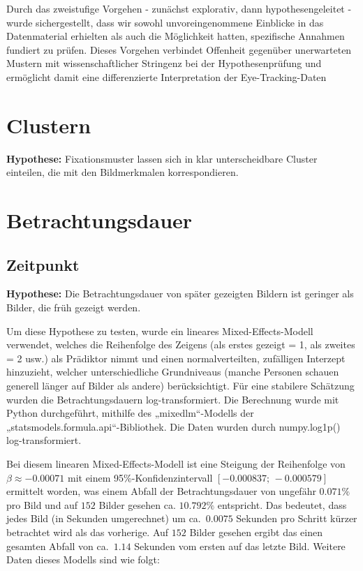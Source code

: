 \documentclass[
    language=german, %
    thesis=seminar, %
    supervisor=postdoc, %
    multiauthor=true, %
    ]{settings/csssa-thesis}
\begin{document}
Durch das zweistufige Vorgehen - zunächst explorativ, dann hypothesengeleitet - wurde sichergestellt,
dass wir sowohl unvoreingenommene Einblicke in das Datenmaterial erhielten als auch die Möglichkeit hatten,
spezifische Annahmen fundiert zu prüfen. Dieses Vorgehen verbindet Offenheit gegenüber unerwarteten Mustern
mit wissenschaftlicher Stringenz bei der Hypothesenprüfung und ermöglicht damit eine differenzierte
Interpretation der Eye-Tracking-Daten

\section{Clustern}
\textbf{Hypothese:} Fixationsmuster lassen sich in klar unterscheidbare Cluster einteilen, die mit den Bildmerkmalen korrespondieren. 

\section{Betrachtungsdauer}
\subsection{Zeitpunkt}
 \textbf{Hypothese:} Die Betrachtungsdauer von später gezeigten Bildern ist geringer als Bilder, die früh gezeigt werden. 

Um diese Hypothese zu testen, wurde ein lineares Mixed-Effects-Modell verwendet, 
welches die Reihenfolge des Zeigens (als erstes gezeigt = 1, als zweites = 2 usw.) 
als Prädiktor nimmt und einen normalverteilten, zufälligen Interzept hinzuzieht,
welcher unterschiedliche Grundniveaus (manche Personen schauen generell länger auf Bilder als andere) berücksichtigt.
Für eine stabilere Schätzung wurden die Betrachtungsdauern log-transformiert. Die Berechnung wurde mit Python durchgeführt, 
mithilfe des „mixedlm“-Modells der „statsmodels.formula.api“-Bibliothek. Die Daten wurden durch numpy.log1p() log-transformiert.

Bei diesem linearen Mixed-Effects-Modell ist eine Steigung der Reihenfolge von 
$\beta \approx -0.00071$ mit einem 95\%-Konfidenzintervall 
$[-0.000837;\,-0.000579]$ ermittelt worden, was einem Abfall der Betrachtungsdauer 
von ungefähr $0.071\%$ pro Bild und auf $152$ Bilder gesehen ca. $10.792\%$ entspricht. 
Das bedeutet, dass jedes Bild (in Sekunden umgerechnet) um ca.\ $0.0075$ Sekunden pro Schritt 
kürzer betrachtet wird als das vorherige. Auf $152$ Bilder gesehen ergibt das 
einen gesamten Abfall von ca.\ $1.14$ Sekunden vom ersten auf das letzte Bild. 
Weitere Daten dieses Modells sind wie folgt:
\end{document}

